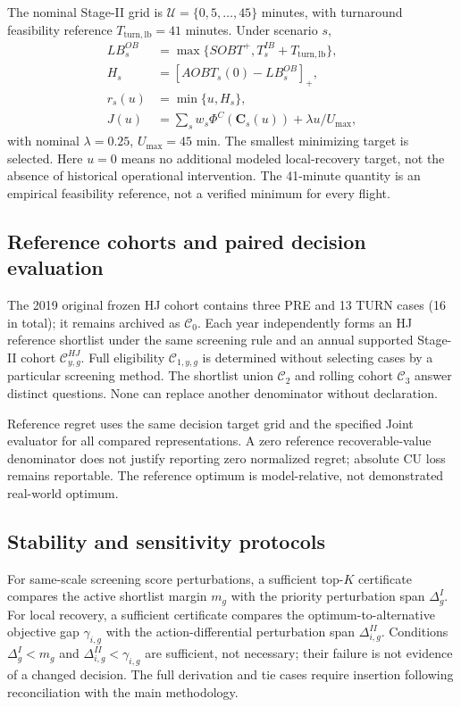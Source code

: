 \documentclass[10pt,a4paper]{article}
\numberwithin{equation}{section}
\begin{document}
The nominal Stage-II grid is $\mathcal U=\{0,5,\ldots,45\}$ minutes, with turnaround feasibility reference $T_{\mathrm{turn,lb}}=41$ minutes. Under scenario $s$,
\begin{equation}
\begin{aligned}
LB^{OB}_s&=\max\{SOBT^+,T^{IB}_s+T_{\mathrm{turn,lb}}\},\\
H_s&=[AOBT_s(0)-LB^{OB}_s]_+,\\
r_s(u)&=\min\{u,H_s\},\\
J(u)&=\sum_s w_s\Phi^C(\mathbf C_s(u))+\lambda u/U_{\max},
\end{aligned}\label{eq:sup_stage2_core}
\end{equation}
with nominal $\lambda=0.25$, $U_{\max}=45$ min. The smallest minimizing target is selected. Here $u=0$ means no additional modeled local-recovery target, not the absence of historical operational intervention. The 41-minute quantity is an empirical feasibility reference, not a verified minimum for every flight.

\subsection{Reference cohorts and paired decision evaluation}
The 2019 original frozen HJ cohort contains three PRE and 13 TURN cases (16 in total); it remains archived as $\mathcal C_0$. Each year independently forms an HJ reference shortlist under the same screening rule and an annual supported Stage-II cohort $\mathcal C^{HJ}_{y,g}$. Full eligibility $\mathcal C_{1,y,g}$ is determined without selecting cases by a particular screening method. The shortlist union $\mathcal C_2$ and rolling cohort $\mathcal C_3$ answer distinct questions. None can replace another denominator without declaration.

Reference regret uses the same decision target grid and the specified Joint evaluator for all compared representations. A zero reference recoverable-value denominator does not justify reporting zero normalized regret; absolute CU loss remains reportable. The reference optimum is model-relative, not demonstrated real-world optimum.

\subsection{Stability and sensitivity protocols}
For same-scale screening score perturbations, a sufficient top-$K$ certificate compares the active shortlist margin $m_g$ with the priority perturbation span $\Delta^I_g$. For local recovery, a sufficient certificate compares the optimum-to-alternative objective gap $\gamma_{i,g}$ with the action-differential perturbation span $\Delta^{II}_{i,g}$. Conditions $\Delta^I_g<m_g$ and $\Delta^{II}_{i,g}<\gamma_{i,g}$ are sufficient, not necessary; their failure is not evidence of a changed decision. The full derivation and tie cases require insertion following reconciliation with the main methodology.
\end{document}
